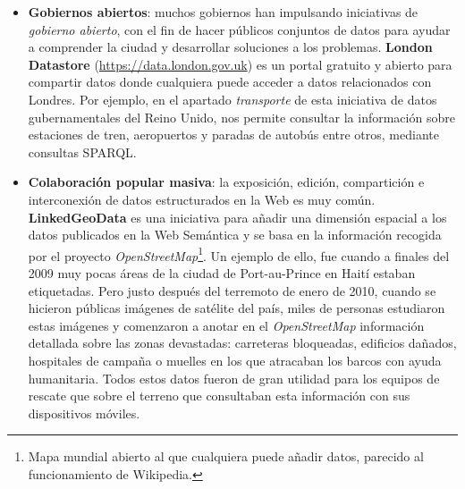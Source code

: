 \begin{itemize}
	\item \textbf{Gobiernos abiertos}: muchos gobiernos han impulsando iniciativas de \textit{gobierno abierto}, con el fin de hacer públicos conjuntos de datos para ayudar a comprender la ciudad y desarrollar soluciones a los problemas. \textbf{London Datastore} (\url{https://data.london.gov.uk}) es un portal gratuito y abierto para compartir datos donde cualquiera puede acceder a datos relacionados con Londres. Por ejemplo, en el apartado \textit{transporte} de esta iniciativa de datos gubernamentales del Reino Unido, nos permite consultar la información sobre estaciones de tren, aeropuertos y paradas de autobús entre otros, mediante consultas SPARQL.

	\item \textbf{Colaboración popular masiva}: la exposición, edición, compartición e interconexión de datos estructurados en la Web es muy común. \textbf{LinkedGeoData} es una iniciativa para añadir una dimensión espacial a los datos publicados en la Web Semántica y se basa en la información recogida por el proyecto \textit{OpenStreetMap}\footnote{Mapa mundial abierto al que cualquiera puede añadir datos, parecido al funcionamiento de Wikipedia.}. Un ejemplo de ello, fue cuando a finales del 2009 muy pocas áreas de la ciudad de Port-au-Prince en Haití estaban etiquetadas. Pero justo después del terremoto de enero de 2010, cuando se hicieron públicas imágenes de satélite del país, miles de personas estudiaron estas imágenes y comenzaron a anotar en el \textit{OpenStreetMap} información detallada sobre las zonas devastadas: carreteras bloqueadas, edificios dañados, hospitales de campaña o muelles en los que atracaban los barcos con ayuda humanitaria. Todos estos datos fueron de gran utilidad para los equipos de rescate que sobre el terreno que consultaban esta información con sus dispositivos móviles.
	
\end{itemize}



